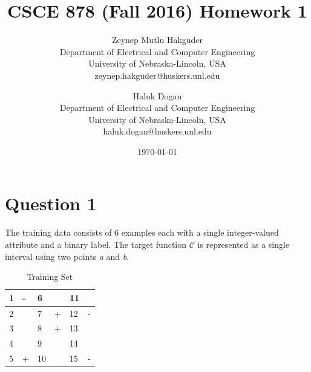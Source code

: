 \documentclass[12pt]{article}
\title{CSCE 878 (Fall 2016) Homework 1}
\author{
        Zeynep Mutlu Hakguder \\
                Department of Electrical and Computer Engineering\\
        University of Nebraska-Lincoln, USA\\
        zeynep.hakguder@huskers.unl.edu
            \and
        Haluk Dogan\\
        Department of Electrical and Computer Engineering\\
        University of Nebraska-Lincoln, USA\\
        haluk.dogan@huskers.unl.edu
}
\date{\today}
\begin{document}
\maketitle

\newpage
\tableofcontents

\newpage
\section{Question 1}
The training data consists of $6$ examples each with a single
integer-valued attribute and a binary label. The target function $\mathcal{C}$ is
represented as a single interval using two points \textit{a} and \textit{b}.

\begin{table}[H]
\centering
\begin{tabular}{|l|l||l|l||l|l|}
\hline
1 & - & 6  &   & 11 &   \\ \hline
2 &   & 7  & + & 12 & - \\ \hline
3 &   & 8  & + & 13 &   \\ \hline
4 &   & 9  &   & 14 &   \\ \hline
5 & + & 10 &   & 15 & - \\ \hline
\end{tabular}
\caption{Training Set}
\label{my-label}
\end{table}
\end{document}
